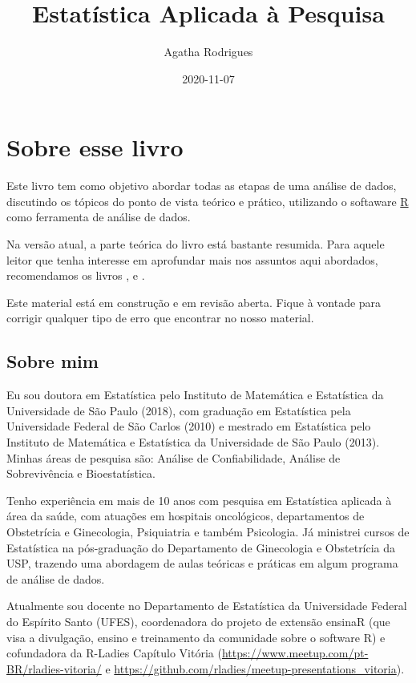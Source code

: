 \documentclass[
]{book}
\title{Estatística Aplicada à Pesquisa}
\author{Agatha Rodrigues}
\date{2020-11-07}
\begin{document}
\maketitle

{
\setcounter{tocdepth}{1}
\tableofcontents
}
\hypertarget{sobre-esse-livro}{%
\chapter{Sobre esse livro}\label{sobre-esse-livro}}

Este livro tem como objetivo abordar todas as etapas de uma análise de dados, discutindo os tópicos do ponto de vista teórico e prático, utilizando o softaware \href{https://cran.r-project.org/}{R} como ferramenta de análise de dados.

Na versão atual, a parte teórica do livro está bastante resumida. Para aquele leitor que tenha interesse em aprofundar mais nos assuntos aqui abordados, recomendamos os livros \citet{morettin2020introduccaoa}, \citet{bussab2004estatistica} e \citet{magalhaes2002noccoes}.

Este material está em construção e em revisão aberta. Fique à vontade para corrigir qualquer tipo de erro que encontrar no nosso material.

\hypertarget{sobre-mim}{%
\section{Sobre mim}\label{sobre-mim}}

Eu sou doutora em Estatística pelo Instituto de Matemática e Estatística da Universidade de São Paulo (2018), com graduação em Estatística pela Universidade Federal de São Carlos (2010) e mestrado em Estatística pelo Instituto de Matemática e Estatística da Universidade de São Paulo (2013). Minhas áreas de pesquisa são: Análise de Confiabilidade, Análise de Sobrevivência e Bioestatística.

Tenho experiência em mais de 10 anos com pesquisa em Estatística aplicada à área da saúde, com atuações em hospitais oncológicos, departamentos de Obstetrícia e Ginecologia, Psiquiatria e também Psicologia. Já ministrei cursos de Estatística na pós-graduação do Departamento de Ginecologia e Obstetrícia da USP, trazendo uma abordagem de aulas teóricas e práticas em algum programa de análise de dados.

Atualmente sou docente no Departamento de Estatística da Universidade Federal do Espírito Santo (UFES), coordenadora do projeto de extensão ensinaR (que visa a divulgação, ensino e treinamento da comunidade sobre o software R) e cofundadora da R-Ladies Capítulo Vitória (\url{https://www.meetup.com/pt-BR/rladies-vitoria/} e \url{https://github.com/rladies/meetup-presentations_vitoria}).
\end{document}
